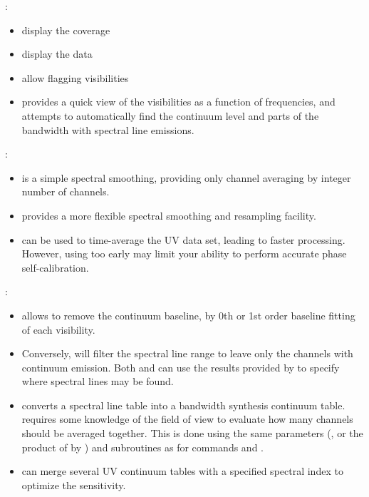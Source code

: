\begin{description}\itemsep 0pt

\item[Data inspection and editing]:
\begin{itemize}\itemsep 0pt
\item {} display the \uv{} coverage
\item {} display the \uv{} data
\item {} allow flagging visibilities
\item {} provides a quick view of the visibilities as a function
of frequencies, and attempts to automatically find the continuum level
and parts of the bandwidth with spectral line emissions.
\end{itemize}

\item[Data size reduction routines]:
\begin{itemize}\itemsep 0pt
\item {} is a simple spectral smoothing, providing only channel 
averaging by integer number of channels.
\item {} provides a more flexible spectral smoothing and resampling
facility. 
\item {}  can be used to time-average the UV data set, leading
to faster processing. However, using  too early may limit
your ability to perform accurate phase self-calibration.
\end{itemize}

\item[Continuum processing commands]:
\begin{itemize}\itemsep 0pt
\item {} allows to remove the continuum baseline, by
0th or 1st order baseline fitting of each visibility. 
\item Conversely,  will filter the spectral line
range to leave only the channels with continuum emission.
Both  and  can use the results provided
by  to specify where spectral lines may be found.
\item {} converts a spectral line \uv{} table into a bandwidth 
synthesis continuum \uv{} table.  requires some knowledge of 
the field of view to evaluate how many channels should be averaged 
together. This is done using the same parameters (, 
or the product of  by ) and subroutines as 
for commands  and .
\item {} can merge several UV continuum 
tables with a specified spectral index to optimize the sensitivity.
\end{itemize}


\end{description}
